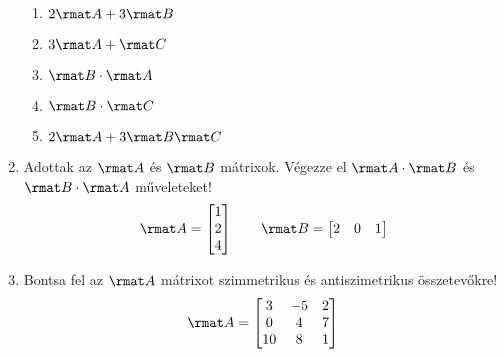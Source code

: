 \documentclass[a4paper, 12pt]{scrartcl}
\begin{document}
\begin{enumerate}
\begin{multicols}{3}
\begin{enumerate}
            \item $2\rmat A + 3\rmat B$

            \item  $3\rmat A + \rmat C$

            \item $\rmat B \cdot \rmat A$

            \item $\rmat B \cdot \rmat C$

            \item $2\rmat A + 3\rmat B\rmat C$
          \end{enumerate}

        \end{multicols}

  \item Adottak az $\rmat A$ és $\rmat B$ mátrixok. Végezze el
        $\rmat A \cdot \rmat B$ és $\rmat B \cdot \rmat A$ műveleteket!
        $$
          \rmat A = \begin{bmatrix}
            1 \\
            2 \\
            4
          \end{bmatrix}
          \qquad
          \rmat B = \begin{bmatrix}
            2 & 0 & 1
          \end{bmatrix}
        $$


  \item Bontsa fel az $\rmat A$ mátrixot szimmetrikus és antiszimetrikus
        összetevőkre!
        $$
          \rmat A = \begin{bmatrix}
            3  & -5 & 2 \\
            0  & 4  & 7 \\
            10 & 8  & 1
          \end{bmatrix}
        $$


\end{enumerate}
\end{document}
